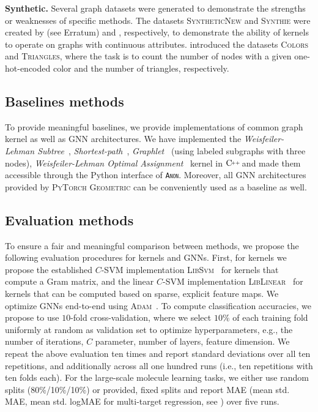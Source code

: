 \documentclass{article}
\newcommand{\xhdr}[1]{{\noindent\bfseries #1}}
\theoremstyle{definition}
\newcommand{\new}[1]{\emph{#1}}
\newcommand{\CPP}[1][]{$\text{C\hspace{-.25ex}}^{_{_{_{++}}}}
	\ifthenelse{\equal{#1}{}}{}{\text{\hspace{-.625ex}#1}}$}
\begin{document}
\xhdr{Synthetic.}
Several graph datasets were generated to demonstrate the strengths or weaknesses of specific methods. The datasets \textsc{SyntheticNew} and \textsc{Synthie} were created by \citet{Fer+2013} (see Erratum) and \citet{Mor+2016}, respectively, to demonstrate the ability of kernels to operate on graphs with continuous attributes.
\citet{Knyazev2019} introduced the datasets \textsc{Colors} and \textsc{Triangles}, where the task is to count the number of nodes with a given one-hot-encoded color and the number of triangles, respectively. 

\subsection{Baselines methods} To provide meaningful baselines, we provide implementations of common graph kernel as well as GNN architectures. We have implemented the \new{Weisfeiler-Lehman Subtree}~\cite{She+2011}, \new{Shortest-path}~\cite{Bor+2005}, \new{Graphlet}~\cite{She+2009} (using labeled subgraphs with three nodes), \new{Weisfeiler-Lehman Optimal Assignment}~\cite{Kri+2016} kernel in \CPP and made them accessible through the Python interface of \textsc{\texttt{Anon}}.  Moreover, all GNN architectures provided by \textsc{PyTorch Geometric} can be conveniently used as a baseline as well. 

\subsection{Evaluation methods}\label{eval} To ensure a fair and meaningful comparison between methods, we propose the following evaluation procedures for kernels and GNNs. First, for kernels we propose the established $C$-SVM implementation \textsc{LibSvm}~\cite{Cha+11} for kernels that compute a Gram matrix, and the linear $C$-SVM implementation \textsc{LibLinear}~\cite{Fan+2008} for kernels  that can be computed based on sparse, explicit feature maps. We optimize GNNs end-to-end using \textsc{Adam}~\cite{Kin+2015}. To compute classification accuracies, we propose to use $10$-fold cross-validation, where we select $10\%$ of each training fold uniformly at random as validation set to optimize hyperparameters, e.g., the number of iterations, $C$ parameter, number of layers, feature dimension. We repeat the above evaluation ten times and report standard deviations over all ten repetitions, and additionally across all one hundred runs (i.e., ten repetitions with ten folds each). For the large-scale molecule learning tasks, we either use random splits (80\%/10\%/10\%) or provided, fixed splits and report MAE (mean std. MAE, mean std. logMAE for multi-target regression, see \cite{Kli+2020}) over five runs. 
\end{document}
